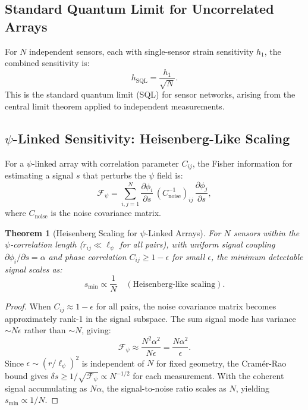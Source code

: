 \documentclass[12pt,a4paper]{article}
\newtheorem{theorem}{Theorem}[section]
\theoremstyle{remark}
\begin{document}
\subsection{Standard Quantum Limit for Uncorrelated Arrays}

For $N$ independent sensors, each with single-sensor strain sensitivity
$h_1$, the combined sensitivity is:
\begin{equation}
h_{\text{SQL}} = \frac{h_1}{\sqrt{N}}.
\label{eq:sql}
\end{equation}
This is the standard quantum limit (SQL) for sensor networks, arising from
the central limit theorem applied to independent measurements.

\subsection{$\psi$-Linked Sensitivity: Heisenberg-Like Scaling}

For a $\psi$-linked array with correlation parameter $C_{ij}$, the
Fisher information for estimating a signal $s$ that perturbs the $\psi$
field is:
\begin{equation}
\mathcal{F}_\psi = \sum_{i,j=1}^N \frac{\partial\phi_i}{\partial s}\,
(C^{-1}_\text{noise})_{ij}\,\frac{\partial\phi_j}{\partial s},
\label{eq:fisher}
\end{equation}
where $C_\text{noise}$ is the noise covariance matrix.

\begin{theorem}[Heisenberg Scaling for $\psi$-Linked Arrays]\label{thm:heisenberg}
For $N$ sensors within the $\psi$-correlation length ($r_{ij} \ll \ell_\psi$
for all pairs), with uniform signal coupling $\partial\phi_i/\partial s = \alpha$
and phase correlation $C_{ij} \geq 1 - \epsilon$ for small $\epsilon$,
the minimum detectable signal scales as:
\begin{equation}
\boxed{s_{\min} \propto \frac{1}{N}\quad (\text{Heisenberg-like scaling})}.
\label{eq:heisenberg}
\end{equation}
\end{theorem}

\begin{proof}
When $C_{ij} \approx 1 - \epsilon$ for all pairs, the noise covariance
matrix becomes approximately rank-1 in the signal subspace.
The sum signal mode has variance $\sim N\epsilon$ rather than $\sim N$, giving:
\begin{equation}
\mathcal{F}_\psi \approx \frac{N^2\alpha^2}{N\epsilon} = \frac{N\alpha^2}{\epsilon}.
\end{equation}
Since $\epsilon \sim (r/\ell_\psi)^2$ is independent of $N$ for fixed
geometry, the Cram\'er-Rao bound gives
$\delta s \geq 1/\sqrt{\mathcal{F}_\psi} \propto N^{-1/2}$ for each
measurement. With the coherent signal accumulating as $N\alpha$, the
signal-to-noise ratio scales as $N$, yielding $s_{\min} \propto 1/N$.
\end{proof}
\end{document}
